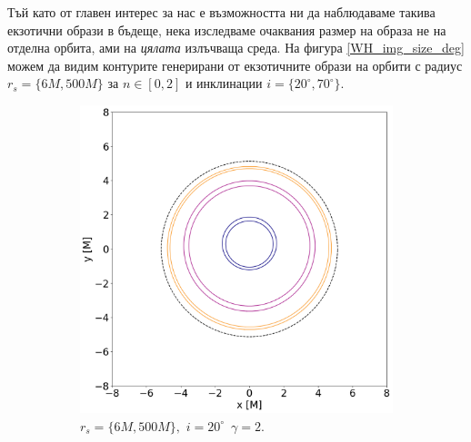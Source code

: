 \documentclass[12pt]{article}
\numberwithin{equation}{section}
\numberwithin{figure}{section}
\begin{document}
	Тъй като от главен интерес за нас е възможността ни да наблюдаваме такива екзотични образи в бъдеще, нека изследваме очаквания размер на образа не на отделна орбита, ами на \emph{цялата} излъчваща среда. На фигура \ref{WH_img_size_deg} можем да видим контурите генерирани от екзотичните образи на орбити с радиус $r_s = \{6M, 500M\}$ за $n\in[0,2]$ и инклинации $i = \{20^\circ,70^\circ\}$.\\
	
	\begin{figure}[!htb]
		\centering
	\begin{subfigure}{7cm}
		\hspace{-0.3cm}
		\includegraphics[scale = 0.25]{Section_6_Morphology_of_the images_of_horizonless_spacetimes/WH_20_deg_r6_r500.png}
		\caption{$r_s = \{6M, 500M\},\,\, i = 20^\circ\,\,\, \gamma = 2$.}
	\end{subfigure}\quad
	\begin{subfigure}{7cm}
		\hspace{-0.3cm}

\end{subfigure}
\end{figure}
\end{document}
